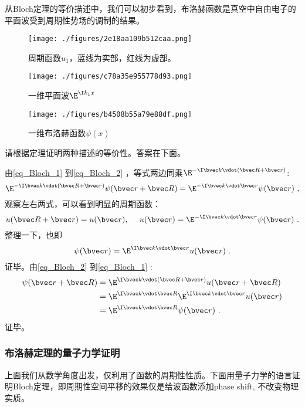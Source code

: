 从Bloch定理的等价描述中，我们可以初步看到，布洛赫函数是真空中自由电子的平面波受到周期性势场的调制的结果。

\begin{figure}[ht]
\centering
\texttt{[image: ./figures/2e18aa109b512caa.png]}
\caption{周期函数$u_1$，蓝线为实部，红线为虚部。} \label{fig_Bloch_3}
\end{figure}

\begin{figure}[ht]
\centering
\texttt{[image: ./figures/c78a35e955778d93.png]}
\caption{一维平面波$\E^{\I k_1 x}$} \label{fig_Bloch_4}
\end{figure}

\begin{figure}[ht]
\centering
\texttt{[image: ./figures/b4508b55a79e88df.png]}
\caption{一维布洛赫函数$\psi(x)$} \label{fig_Bloch_5}
\end{figure}

\begin{exercise}{}
请根据定理证明两种描述的等价性。答案在下面。
\end{exercise}
由\autoref{eq_Bloch_1} 到\autoref{eq_Bloch_2} ，等式两边同乘$\E^{-\I \bvec k \vdot (\bvec R + \bvec r)}$:
\begin{equation}
\E^{-\I \bvec k \vdot (\bvec R + \bvec r)}\psi(\bvec r + \bvec R) = \E^{-\I \bvec k \vdot \bvec r}\psi(\bvec r)~,
\end{equation}
观察左右两式，可以看到明显的周期函数：
\begin{equation}
u(\bvec R + \bvec r) = u(\bvec r),~\quad u(\bvec r) = \E^{-\I \bvec k \vdot \bvec r}\psi(\bvec r)~.
\end{equation}
整理一下，也即
\begin{equation}
\psi(\bvec r) = \E^{\I \bvec k \vdot \bvec r} u(\bvec r)~.
\end{equation}
证毕。由\autoref{eq_Bloch_2} 到\autoref{eq_Bloch_1} :
\begin{align}
\psi(\bvec r + \bvec R) &= \E^{\I \bvec k \vdot (\bvec R + \bvec r)} u(\bvec r + \bvec R)\\
&= \E^{\I \bvec k \vdot \bvec R } \E^{\I \bvec k \vdot  \bvec r}u(\bvec r )\\ &= \E^{\I \bvec k \vdot \bvec R } \psi(\bvec r)~.
\end{align}
证毕。

\subsubsection{布洛赫定理的量子力学证明}
上面我们从数学角度出发，仅利用了函数的周期性性质。下面用量子力学的语言证明Bloch定理，即周期性空间平移的效果仅是给波函数添加phase shift, 不改变物理实质。

